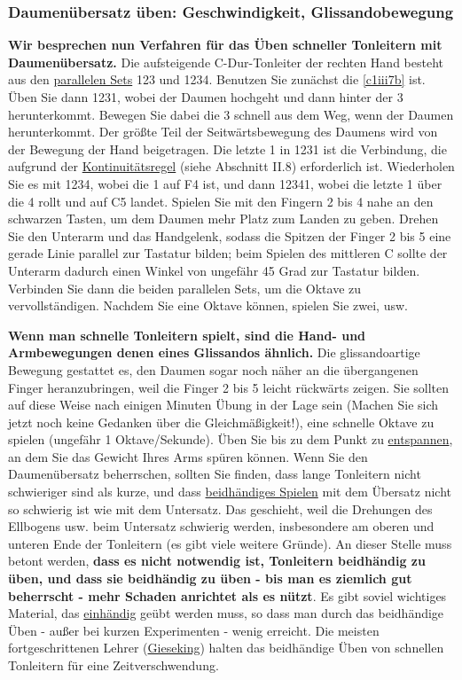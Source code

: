 
\label{c1iii5a2}
\subsubsection{Daumenübersatz üben: Geschwindigkeit, Glissandobewegung}
\label{c1iii5c}

\textbf{Wir besprechen nun Verfahren für das Üben schneller Tonleitern mit Daumenübersatz.}
Die aufsteigende C-Dur-Tonleiter der rechten Hand besteht aus den \hyperref[c1iv2]{parallelen Sets} 123 und 1234.
Benutzen Sie zunächst die \hyperref[c1iii7b]{\autoref{c1iii7b}} ist.
Üben Sie dann 1231, wobei der Daumen hochgeht und dann hinter der 3 herunterkommt.
Bewegen Sie dabei die 3 schnell aus dem Weg, wenn der Daumen herunterkommt.
Der größte Teil der Seitwärtsbewegung des Daumens wird von der Bewegung der Hand beigetragen.
Die letzte 1 in 1231 ist die Verbindung, die aufgrund der \hyperref[c1ii8]{Kontinuitätsregel} (siehe Abschnitt II.8) erforderlich ist.
Wiederholen Sie es mit 1234, wobei die 1 auf F4 ist, und dann 12341, wobei die letzte 1 über die 4 rollt und auf C5 landet.
Spielen Sie mit den Fingern 2 bis 4 nahe an den schwarzen Tasten, um dem Daumen mehr Platz zum Landen zu geben.
Drehen Sie den Unterarm und das Handgelenk, sodass die Spitzen der Finger 2 bis 5 eine gerade Linie parallel zur Tastatur bilden; beim Spielen des mittleren C sollte der Unterarm dadurch einen Winkel von ungefähr 45 Grad zur Tastatur bilden.
Verbinden Sie dann die beiden parallelen Sets, um die Oktave zu vervollständigen.
Nachdem Sie eine Oktave können, spielen Sie zwei, usw.

\textbf{Wenn man schnelle Tonleitern spielt, sind die Hand- und Armbewegungen denen eines Glissandos ähnlich.}
Die glissandoartige Bewegung gestattet es, den Daumen sogar noch näher an die übergangenen Finger heranzubringen, weil die Finger 2 bis 5 leicht rückwärts zeigen.
Sie sollten auf diese Weise nach einigen Minuten Übung in der Lage sein (Machen Sie sich jetzt noch keine Gedanken über die Gleichmäßigkeit!), eine schnelle Oktave zu spielen (ungefähr 1 Oktave/Sekunde).
Üben Sie bis zu dem Punkt zu \hyperref[c1ii14]{entspannen}, an dem Sie das Gewicht Ihres Arms spüren können.
Wenn Sie den Daumenübersatz beherrschen, sollten Sie finden, dass lange Tonleitern nicht schwieriger sind als kurze, und dass \hyperref[c1ii25]{beidhändiges Spielen} mit dem Übersatz nicht so schwierig ist wie mit dem Untersatz.
Das geschieht, weil die Drehungen des Ellbogens usw. beim Untersatz schwierig werden, insbesondere am oberen und unteren Ende der Tonleitern (es gibt viele weitere Gründe).
An dieser Stelle muss betont werden, \textbf{dass es nicht notwendig ist, Tonleitern beidhändig zu üben, und dass sie beidhändig zu üben - bis man es ziemlich gut beherrscht - mehr Schaden anrichtet als es nützt}.
Es gibt soviel wichtiges Material, das \hyperref[c1ii7]{einhändig} geübt werden muss, so dass man durch das beidhändige Üben - außer bei kurzen Experimenten - wenig erreicht.
Die meisten fortgeschrittenen Lehrer (\hyperref[Gieseking]{Gieseking}) halten das beidhändige Üben von schnellen Tonleitern für eine Zeitverschwendung.

